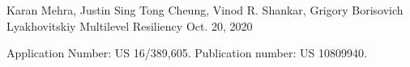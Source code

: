 

\begin{cventries}

  \cventry
    {Karan Mehra, Justin Sing Tong Cheung, Vinod R. Shankar, Grigory Borisovich Lyakhovitskiy} %
    {Multilevel Resiliency}
    {}
    {Oct. 20, 2020} %
    {
      \begin{cvitems}
        \item {
          Application Number: US 16/389,605. Publication number: US 10809940.
        }
      \end{cvitems}
    }

\end{cventries}